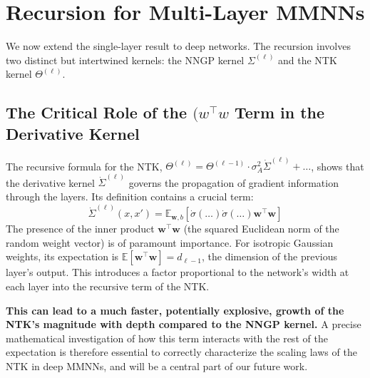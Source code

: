 \documentclass[a4paper]{article}
\begin{document}
\section{Recursion for Multi-Layer MMNNs}
We now extend the single-layer result to deep networks. The recursion involves two distinct but intertwined kernels: the NNGP kernel $\Sigma^{(\ell)}$ and the NTK kernel $\Theta^{(\ell)}$.

\subsection{The Critical Role of the $({w}^\top{w}$ Term in the Derivative Kernel}
The recursive formula for the NTK, $\Theta^{(\ell)} = \Theta^{(\ell-1)} \cdot \sigma_A^2 \dot{\Sigma}^{(\ell)} + \dots$, shows that the derivative kernel $\dot{\Sigma}^{(\ell)}$ governs the propagation of gradient information through the layers. Its definition contains a crucial term:
\[ \dot{\Sigma}^{(\ell)}(x, x') = \mathbb{E}_{\bm{w}, b} \left[ \dot{\sigma}(\dots) \dot{\sigma}(\dots) \bm{w}^\top\bm{w} \right] \]
The presence of the inner product $\bm{w}^\top\bm{w}$ (the squared Euclidean norm of the random weight vector) is of paramount importance. For isotropic Gaussian weights, its expectation is $\mathbb{E}[\bm{w}^\top\bm{w}] = d_{\ell-1}$, the dimension of the previous layer's output. This introduces a factor proportional to the network's width at each layer into the recursive term of the NTK.

\textbf{This can lead to a much faster, potentially explosive, growth of the NTK's magnitude with depth compared to the NNGP kernel.} A precise mathematical investigation of how this term interacts with the rest of the expectation is therefore essential to correctly characterize the scaling laws of the NTK in deep MMNNs, and will be a central part of our future work.
\end{document}
